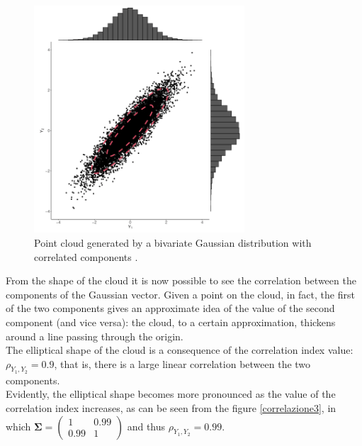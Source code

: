 \begin{figure}[h]
    \centering
    \includegraphics[width=0.7\textwidth]{images/Gaussiane/VettoreBivariatoIndipendenza2.png}
    \caption{Point cloud generated by a bivariate Gaussian distribution with correlated components \cite{wilkinson_introduction_2020}.}
    \label{correlazione2}
\end{figure}

From the shape of the cloud it is now possible to see the correlation between the components of the Gaussian vector. Given a point on the cloud, in fact, the first of the two components gives an approximate idea of the value of the second component (and vice versa): the cloud, to a certain approximation, thickens around a line passing through the origin.\\
The elliptical shape of the cloud is a consequence of the correlation index value: $\rho_{Y_1,Y_2}=0.9$, that is, there is a large linear correlation between the two components.\\

\newpage
Evidently, the elliptical shape becomes more pronounced as the value of the correlation index increases, as can be seen from the figure \ref{correlazione3}, in which $\mathbf{\Sigma}=\begin{pmatrix}1&0.99\\0.99&1\end{pmatrix}$ and thus $\rho_{Y_1,Y_2}=0.99$.

